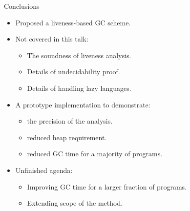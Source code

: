 \begin{frame}{Conclusions}
  \begin{itemize}\itemsep1em
  \item Proposed a liveness-based GC scheme. 
  \item Not covered in this talk:
    \begin{itemize}
    \item The soundness of liveness analysis.
    \item Details of undecidability proof.
    \item Details of handling lazy languages.
    \end{itemize}
    \item A prototype implementation to demonstrate:
      \begin{itemize}
      \item the precision of the analysis.
      \item reduced heap requirement.
      \item reduced GC time for a majority of programs.
    \end{itemize}
    \item Unfinished agenda:
      \begin{itemize}
      \item Improving GC time for a larger fraction of programs.
      \item Extending scope of the method.
    \end{itemize}
  \end{itemize}
\end{frame}



